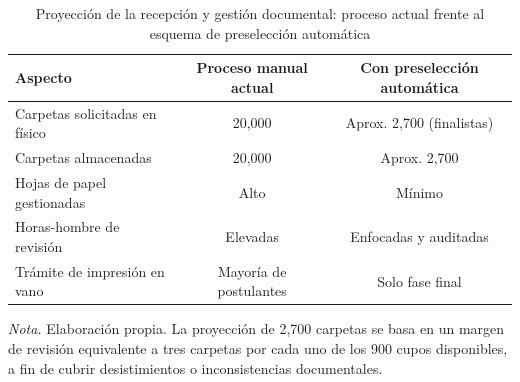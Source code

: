 \begin{table}[H]
\caption{Proyección de la recepción y gestión documental: proceso actual frente al esquema de preselección automática}
\label{tab:proyeccion_recepcion}
\begin{threeparttable}
\begin{tabular}{lc c}
\toprule
Aspecto & Proceso manual actual & Con preselección automática \\
\midrule
Carpetas solicitadas en físico & 20,000 & Aprox. 2,700 (finalistas) \\
Carpetas almacenadas & 20,000 & Aprox. 2,700 \\
Hojas de papel gestionadas & Alto & Mínimo \\
Horas-hombre de revisión & Elevadas & Enfocadas y auditadas \\
Trámite de impresión en vano & Mayoría de postulantes & Solo fase final \\
\bottomrule
\end{tabular}
\begin{tablenotes}
\item \textit{Nota.} Elaboración propia. La proyección de 2,700 carpetas se basa en un margen de revisión equivalente a tres carpetas por cada uno de los 900 cupos disponibles, a fin de cubrir desistimientos o inconsistencias documentales.
\end{tablenotes}
\end{threeparttable}
\end{table}